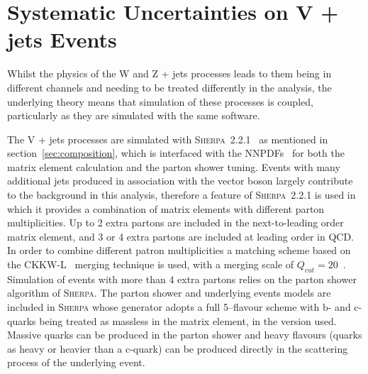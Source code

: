 \section{Systematic Uncertainties on V + jets Events}
\label{sec:vjets}
Whilst the physics of the W and Z + jets processes leads to them being in
different channels and needing to be treated differently in the analysis, the
underlying theory means that simulation of these processes is coupled,
particularly as they are simulated with the same software.

The V + jets processes are simulated with
\textsc{Sherpa}~2.2.1~\cite{1126-6708-2009-02-007} as mentioned in
section~\ref{sec:composition}, which is interfaced with the
NNPDFs~\cite{Ball:2012cx} for both the matrix element calculation and the parton shower
tuning. Events with many additional jets produced in association with the vector
boson largely contribute to the background in this analysis, therefore a feature
of \textsc{Sherpa}~2.2.1 is used in which it provides a combination of matrix
elements with different parton multiplicities. Up to 2 extra partons are
included in the next-to-leading order matrix element, and 3 or 4 extra partons
are included at leading order in QCD. In order to combine different patron
multiplicities a matching scheme based on the CKKW-L~\cite{Lonnblad:2001iq,
  Lavesson:2005xu} merging technique is used, with a merging scale of $Q_{cut} =
20$~\GeV. Simulation of events with more than 4 extra partons relies on the
parton shower algorithm of \textsc{Sherpa}. The parton shower and underlying
events models are included in \textsc{Sherpa} whose generator adopts a full
5--flavour scheme with b- and c-quarks being treated as massless in the matrix
element, in the version used. Massive quarks can be produced in the parton
shower and heavy flavours (quarks as heavy or heavier than a c-quark) can be
produced directly in the scattering process of the underlying event.

